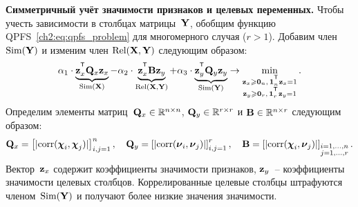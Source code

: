 \textbf{Симметричный учёт значимости признаков и целевых переменных.}
Чтобы учесть зависимости в столбцах матрицы~$\mathbf{Y}$, обобщим функцию QPFS~\eqref{ch2:eq:qpfs_problem} для многомерного случая ($r > 1$).
Добавим член~$\text{Sim}(\mathbf{Y})$ и изменим член $\text{Rel}(\mathbf{X}, \mathbf{Y})$ следующим образом:
\begin{equation}
\alpha_1 \cdot \underbrace{\bz_x^{\T} \bQ_x \bz_x}_{\text{Sim}(\bX)} - \alpha_2 \cdot \underbrace{\bz_x^{\T} \bB \bz_y}_{\text{Rel}(\bX, \bY)} + \alpha_3 \cdot \underbrace{\bz_y^{\T} \bQ_y \bz_y}_{\text{Sim}(\bY)} \rightarrow \min_{\substack{\bz_x \geq \bZero_n, \, \bOne_n^{\T}\bz_x=1 \\ \bz_y \geq \bZero_r, \, \bOne_r^{\T}\bz_y=1}}.
\label{ch2:eq:symimp}
\end{equation}
Определим элементы матриц~$\mathbf{Q}_x \in \mathbb{R}^{n \times n}$, $\mathbf{Q}_y \in \mathbb{R}^{r \times r}$ и $\mathbf{B} \in \mathbb{R}^{n \times r}$ следующим образом:
\begin{equation*}
\mathbf{Q}_x = \left[ |\text{corr}(\boldsymbol{\chi}_i, \boldsymbol{\chi}_j)| \right]_{i,j=1}^n, \quad
\mathbf{Q}_y = \left[ |\text{corr}(\boldsymbol{\nu}_i, \boldsymbol{\nu}_j)| \right]_{i,j=1}^r, \quad
\mathbf{B} =  \left[ |\text{corr}(\boldsymbol{\chi}_i, \boldsymbol{\nu}_j)| \right]_{\substack{i=1, \dots, n \\ j=1, \dots, r}}.
\end{equation*}
Вектор~$\mathbf{z}_x$ содержит коэффициенты значимости признаков, $\mathbf{z}_y$~-- коэффициенты значимости целевых столбцов.
Коррелированные целевые столбцы штрафуются членом~$\text{Sim}(\mathbf{Y})$ и получают более низкие значения значимости.

